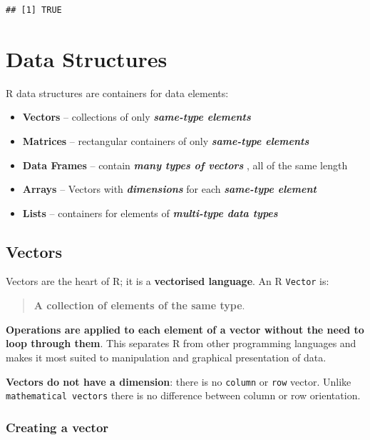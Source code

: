 \documentclass[]{book}
\providecommand{\tightlist}{%
  \setlength{\itemsep}{0pt}\setlength{\parskip}{0pt}}
\theoremstyle{definition}
\theoremstyle{definition}
\theoremstyle{definition}
\theoremstyle{remark}
\begin{document}
\begin{verbatim}
## [1] TRUE
\end{verbatim}

\hypertarget{data-structures}{%
\section{Data Structures}\label{data-structures}}

R data structures are containers for data elements:

\begin{itemize}
\tightlist
\item
  \textbf{Vectors} -- collections of only \textbf{\emph{same-type
  elements}}
\item
  \textbf{Matrices} -- rectangular containers of only
  \textbf{\emph{same-type elements}}
\item
  \textbf{Data Frames} -- contain \textbf{\emph{many types of vectors}}
  , all of the same length
\item
  \textbf{Arrays} -- Vectors with \textbf{\emph{dimensions}} for each
  \textbf{\emph{same-type element}}
\item
  \textbf{Lists} -- containers for elements of \textbf{\emph{multi-type
  data types}}
\end{itemize}

\hypertarget{vectors}{%
\subsection{Vectors}\label{vectors}}

Vectors are the heart of R; it is a \textbf{vectorised language}. An R
\texttt{Vector} is:

\begin{quote}
\textbf{A collection of elements of the same type}.
\end{quote}

\textbf{Operations are applied to each element of a vector without the
need to loop through them}. This separates R from other programming
languages and makes it most suited to manipulation and graphical
presentation of data.

\textbf{Vectors do not have a dimension}: there is no \texttt{column} or
\texttt{row} vector. Unlike \texttt{mathematical\ vectors} there is no
difference between column or row orientation.

\hypertarget{creating-a-vector}{%
\subsubsection{Creating a vector}\label{creating-a-vector}}
\end{document}
